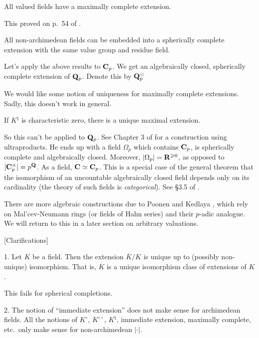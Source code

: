 \begin{theorem}[Krull]
All valued fields have a maximally complete extension. 
\end{theorem}

This proved on p.~54 of \cite{narici-beckenstein-bachman}. 

\begin{theorem}
All non-archimedean fields can be embedded into a spherically complete 
extension with the same value group and residue field. 
\end{theorem}

\begin{example}
Let's apply the above results to $\mathbf{C}_p$. We get an algebraically closed, 
spherically complete extension of $\mathbf{Q}_p$. Denote this by $\mathbf{Q}_p^\odot$
\end{example}

We would like some notion of uniqueness for maximally complete extensions. 
Sadly, this doesn't work in general. 

\begin{theorem}[Kaplansky]
If $K^\natural$ is characteristic zero, there is a unique maximal extension. 
\end{theorem}

So this can't be applied to $\mathbf{Q}_p$. See Chapter 3 of \cite{robert-2000} for 
a construction using ultraproducts. He ends up with a field $\Omega_p$ which 
contains $\mathbf{C}_p$, is spherically complete and algebraically closed. Moreover, 
$|\Omega_p|=\mathbf{R}^{\geqslant 0}$, as opposed to $|\mathbf{C}_p^\times|=p^{\mathbf{Q}}$. As a 
field, $\mathbf{C}\simeq \mathbf{C}_p$. This is a special case of the general theorem that 
the isomorphism of an uncountable algebraically closed field depends only on 
its cardinality (the theory of such fields is \emph{categorical}). See 
\S 3.5 of \cite{robert-2000}. 

There are more algebraic constructions due to Poonen \cite{poonen-1993} and 
Kedlaya \cite{kedlaya-2001}, which rely on Mal'cev-Neumann rings (or fields of 
Hahn series) and their $p$-adic analogue. We will return to this in a later 
section on arbitrary valuations. 

[Clarifications]

1. Let $K$ be a field. Then the extension $\overline K/K$ is unique up to 
(possibly non-unique) isomorphism. That is, $\overline K$ is a unique 
isomorphism class of extensions of $K$. 

This fails for spherical completions. 

2. The notion of ``immediate extension'' does not make sense for archimedean 
fields. All the notions of $K^\circ$, $K^{\circ\circ}$, $K^\natural$, 
immediate extension, maximally complete, etc.~only make sense for non-archimedean 
$|\cdot|$. 


